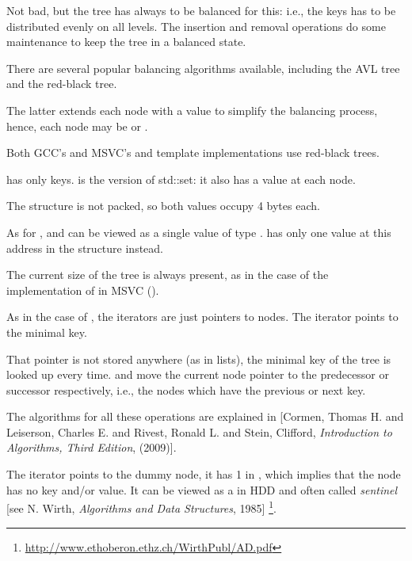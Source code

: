 Not bad, but the tree has always to be balanced for this: i.e., the keys has to be distributed evenly on all levels.
The insertion and removal operations do some maintenance to keep the tree in a balanced state.

There are several popular balancing algorithms available, including the AVL tree and the red-black tree.

The latter extends each node with a  value to simplify the balancing process, hence, 
each node may be  or .

Both GCC's and MSVC's  and  template implementations use red-black trees.

 has only keys.
 is the  version of std::set: it also has a value at each node.






The structure is not packed, so both \Tchar values occupy 4 bytes each.

As for ,  and  can be viewed as a single value of type .
has only one value at this address in the structure instead.

The current size of the tree is always present, as in the case of the implementation of  in MSVC ().

As in the case of , 
the iterators are just pointers to nodes.
The  iterator points to the minimal key.

That pointer is not stored anywhere (as in lists), the minimal key of the tree is looked up every time.
 and  
move the current node pointer to the predecessor or successor respectively, i.e., the nodes which have the previous or next key.

The algorithms for all these operations are explained in
[Cormen, Thomas H. and Leiserson, Charles E. and Rivest, Ronald L. and Stein, Clifford,
\emph{Introduction to Algorithms, Third Edition}, (2009)].

The  iterator points to the dummy node, it has 1 in , which implies that 
the node has no key and/or value.
It can be viewed as a  in \ac{HDD}
and often called \emph{sentinel} [see N. Wirth, \emph{Algorithms and Data Structures}, 1985]
\footnote{\url{http://www.ethoberon.ethz.ch/WirthPubl/AD.pdf}}.

